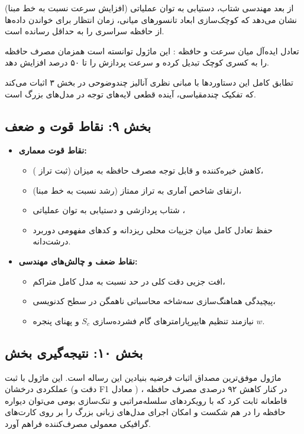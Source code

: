 از بعد مهندسی شتاب، دستیابی به توان عملیاتی  (افزایش  سرعت نسبت به خط مبنا) نشان می‌دهد که کوچک‌سازی ابعاد تانسورهای میانی، زمان انتظار برای خواندن داده‌ها از حافظه سراسری را به حداقل رسانده است.

تعادل ایده‌آل میان سرعت و حافظه : این ماژول توانسته است همزمان مصرف حافظه را به کسری کوچک تبدیل کرده و سرعت پردازش را تا ۵۰ درصد افزایش دهد.

تطابق کامل این دستاوردها با مبانی نظری آنالیز چندوضوحی در بخش ۳ اثبات می‌کند که تفکیک چندمقیاسی، آینده قطعی لایه‌های توجه در مدل‌های بزرگ است.

\subsection*{بخش ۹: نقاط قوت و ضعف }
\begin{itemize}
    \item \textbf{نقاط قوت معماری:}
    \begin{itemize}
        \item کاهش خیره‌کننده و قابل توجه مصرف حافظه به میزان  (ثبت تراز )،
        \item ارتقای شاخص آماری  به تراز ممتاز  (رشد  نسبت به خط مبنا)،
        \item شتاب پردازشی  و دستیابی به توان عملیاتی ،
        \item حفظ تعادل کامل میان جزییات محلی ریزدانه و کدهای مفهومی دوربرد درشت‌دانه.
    \end{itemize}
    \item \textbf{نقاط ضعف و چالش‌های مهندسی:}
    \begin{itemize}
        \item افت جزیی دقت کلی در حد  نسبت به مدل کامل متراکم،
        \item پیچیدگی هماهنگ‌سازی سه‌شاخه محاسباتی ناهمگن در سطح کدنویسی،
        \item نیازمند تنظیم هایپرپارامترهای گام فشرده‌سازی $S_c$ و پهنای پنجره $w$.
    \end{itemize}
\end{itemize}

\subsection*{بخش ۱۰: نتیجه‌گیری بخش }
ماژول  موفق‌ترین مصداق اثبات فرضیه بنیادین این رساله است. این ماژول با ثبت عملکردی درخشان (دقت  و F1 معادل ) در کنار کاهش ۹۲ درصدی مصرف حافظه ، قاطعانه ثابت کرد که با رویکردهای سلسله‌مراتبی و تنک‌سازی بومی می‌توان دیواره حافظه را در هم شکست و امکان اجرای مدل‌های زبانی بزرگ را بر روی کارت‌های گرافیکی معمولی مصرف‌کننده فراهم آورد.

